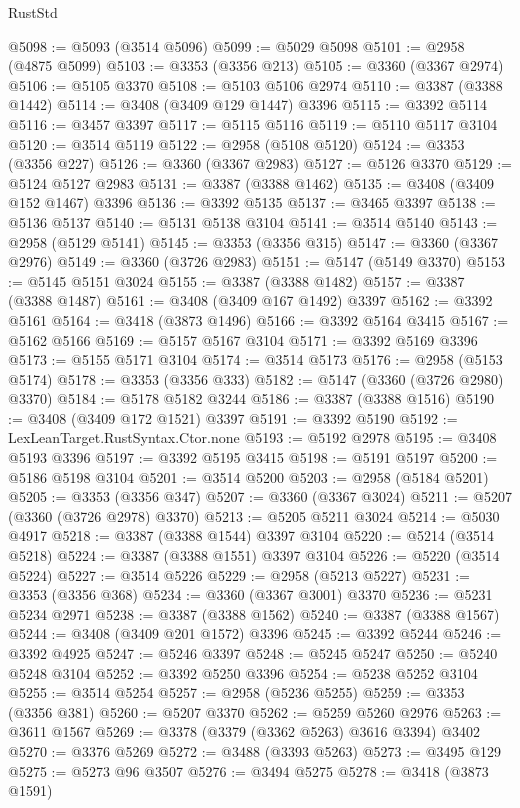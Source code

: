 \begin{lexlean}{RustStd}
\begin{coremodule}
@5098 := @5093 (@3514 @5096)
@5099 := @5029 @5098
@5101 := @2958 (@4875 @5099)
@5103 := @3353 (@3356 @213)
@5105 := @3360 (@3367 @2974)
@5106 := @5105 @3370
@5108 := @5103 @5106 @2974
@5110 := @3387 (@3388 @1442)
@5114 := @3408 (@3409 @129 @1447) @3396
@5115 := @3392 @5114
@5116 := @3457 @3397
@5117 := @5115 @5116
@5119 := @5110 @5117 @3104
@5120 := @3514 @5119
@5122 := @2958 (@5108 @5120)
@5124 := @3353 (@3356 @227)
@5126 := @3360 (@3367 @2983)
@5127 := @5126 @3370
@5129 := @5124 @5127 @2983
@5131 := @3387 (@3388 @1462)
@5135 := @3408 (@3409 @152 @1467) @3396
@5136 := @3392 @5135
@5137 := @3465 @3397
@5138 := @5136 @5137
@5140 := @5131 @5138 @3104
@5141 := @3514 @5140
@5143 := @2958 (@5129 @5141)
@5145 := @3353 (@3356 @315)
@5147 := @3360 (@3367 @2976)
@5149 := @3360 (@3726 @2983)
@5151 := @5147 (@5149 @3370)
@5153 := @5145 @5151 @3024
@5155 := @3387 (@3388 @1482)
@5157 := @3387 (@3388 @1487)
@5161 := @3408 (@3409 @167 @1492) @3397
@5162 := @3392 @5161
@5164 := @3418 (@3873 @1496)
@5166 := @3392 @5164 @3415
@5167 := @5162 @5166
@5169 := @5157 @5167 @3104
@5171 := @3392 @5169 @3396
@5173 := @5155 @5171 @3104
@5174 := @3514 @5173
@5176 := @2958 (@5153 @5174)
@5178 := @3353 (@3356 @333)
@5182 := @5147 (@3360 (@3726 @2980) @3370)
@5184 := @5178 @5182 @3244
@5186 := @3387 (@3388 @1516)
@5190 := @3408 (@3409 @172 @1521) @3397
@5191 := @3392 @5190
@5192 := LexLeanTarget.RustSyntax.Ctor.none
@5193 := @5192 @2978
@5195 := @3408 @5193 @3396
@5197 := @3392 @5195 @3415
@5198 := @5191 @5197
@5200 := @5186 @5198 @3104
@5201 := @3514 @5200
@5203 := @2958 (@5184 @5201)
@5205 := @3353 (@3356 @347)
@5207 := @3360 (@3367 @3024)
@5211 := @5207 (@3360 (@3726 @2978) @3370)
@5213 := @5205 @5211 @3024
@5214 := @5030 @4917
@5218 := @3387 (@3388 @1544) @3397 @3104
@5220 := @5214 (@3514 @5218)
@5224 := @3387 (@3388 @1551) @3397 @3104
@5226 := @5220 (@3514 @5224)
@5227 := @3514 @5226
@5229 := @2958 (@5213 @5227)
@5231 := @3353 (@3356 @368)
@5234 := @3360 (@3367 @3001) @3370
@5236 := @5231 @5234 @2971
@5238 := @3387 (@3388 @1562)
@5240 := @3387 (@3388 @1567)
@5244 := @3408 (@3409 @201 @1572) @3396
@5245 := @3392 @5244
@5246 := @3392 @4925
@5247 := @5246 @3397
@5248 := @5245 @5247
@5250 := @5240 @5248 @3104
@5252 := @3392 @5250 @3396
@5254 := @5238 @5252 @3104
@5255 := @3514 @5254
@5257 := @2958 (@5236 @5255)
@5259 := @3353 (@3356 @381)
@5260 := @5207 @3370
@5262 := @5259 @5260 @2976
@5263 := @3611 @1567
@5269 := @3378 (@3379 (@3362 @5263) @3616 @3394) @3402
@5270 := @3376 @5269
@5272 := @3488 (@3393 @5263)
@5273 := @3495 @129
@5275 := @5273 @96 @3507
@5276 := @3494 @5275
@5278 := @3418 (@3873 @1591)

\end{coremodule}
\end{lexlean}
